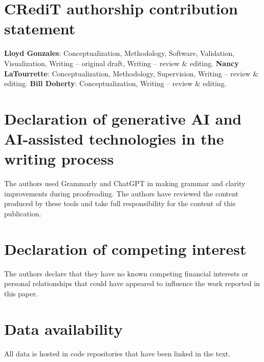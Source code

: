 \documentclass[final,5p,times,twocolumn]{elsarticle}
\begin{document}
\section*{CRediT authorship contribution statement}

\textbf{Lloyd Gonzales}: Conceptualization, Methodology, Software, Validation, Visualization, Writing -- original draft, Writing -- review \& editing. 
\textbf{Nancy LaTourrette}: Conceptualization, Methodology, Supervision, Writing -- review \& editing. 
\textbf{Bill Doherty}: Conceptualization, Writing -- review \& editing.

\section*{Declaration of generative AI and AI-assisted technologies in the writing process}

The authors used Grammarly and ChatGPT in making grammar and clarity improvements
during proofreading. The authors have reviewed the content produced by these tools
and take full responsibility for the content of this publication.

\section*{Declaration of competing interest}

The authors declare that they have no known competing financial interests or
personal relationships that could have appeared to influence the work reported
in this paper.


\section*{Data availability}

All data is hosted in code repositories that have been linked in the text.

\appendix

%  

\end{document}
